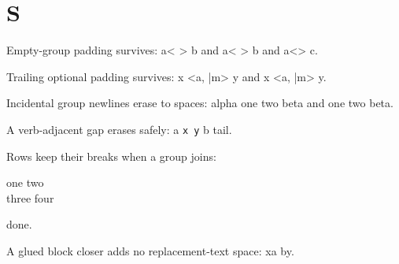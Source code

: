 \documentclass{article}
\newcommand{\pad}[1]{<#1>}
\newcommand{\optpad}[2][def]{<#1|#2>}
\def\gluedcloser#1{a%
  b}
\begin{document}
\section{S}

Empty-group padding survives: a\pad{ } b and a\pad{
} b and a\pad{} c.

Trailing optional padding survives: x \optpad[a, ]{m} y and x \optpad[a,
]{m} y.

Incidental group newlines erase to spaces: alpha {one
two} beta and {one two} beta.

A verb-adjacent gap erases safely: {a \verb|x y|
b} tail.

Rows keep their breaks when a group joins: \parbox{3cm}{one two \\ three
four} done.

A glued block closer adds no replacement-text space: x\gluedcloser{}y.
\end{document}
